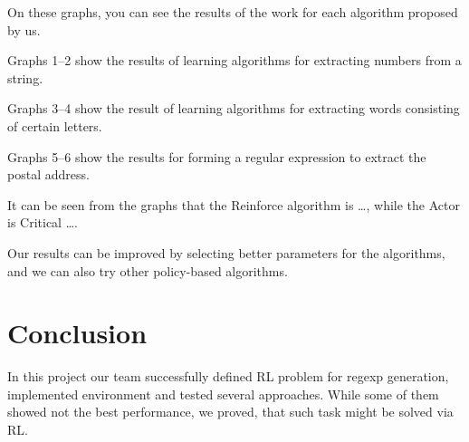 \documentclass{article}
\begin{document}
On these graphs, you can see the results of the work for each algorithm proposed by us.

Graphs 1--2 show the results of learning algorithms for extracting numbers from a string.

Graphs 3--4 show the result of learning algorithms for extracting words consisting of certain letters.

Graphs 5--6 show the results for forming a regular expression to extract the postal address.

It can be seen from the graphs that the Reinforce algorithm is \ldots, while the Actor is Critical \ldots.

Our results can be improved by selecting better parameters for the algorithms, and we can also try other policy-based algorithms.



\section{Conclusion}

In this project our team successfully defined RL problem for regexp generation, implemented environment and tested several approaches. While some of them showed not the best performance, we proved, that such task might be solved via RL.






\end{document}
